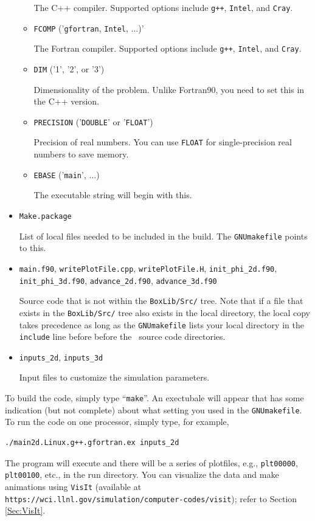 \begin{itemize}
\begin{itemize}
    The C++ compiler.  Supported options include {\tt g++}, {\tt Intel}, and
    {\tt Cray}.

    \item {\tt FCOMP} ('{\tt gfortran}, {\tt Intel}, $\ldots$)'

    The Fortran compiler.  Supported options include {\tt g++}, {\tt Intel}, and
    {\tt Cray}.

    \item {\tt DIM} ('1', '2', or '3')

    Dimensionality of the problem.  Unlike Fortran90, you need to set this in the C++ version.

    \item {\tt PRECISION} ('{\tt DOUBLE}' or '{\tt FLOAT}')

    Precision of real numbers.  You can use {\tt FLOAT} for single-precision real numbers to save memory.

    \item {\tt EBASE} ('{\tt main}', $\ldots$)

    The executable string will begin with this.

  \end{itemize}

\item {\tt Make.package}

List of local files needed to be included in the build.  The {\tt GNUmakefile} points to this.

\item {\tt main.f90}, {\tt writePlotFile.cpp}, {\tt writePlotFile.H}, {\tt init\_phi\_2d.f90},
      {\tt init\_phi\_3d.f90}, {\tt advance\_2d.f90}, {\tt advance\_3d.f90}

Source code that is not within the {\tt BoxLib/Src/} tree.  Note that if a file that 
exists in the
{\tt BoxLib/Src/} tree also exists in the local directory, the local copy takes precedence
as long as the {\tt GNUmakefile} lists your local directory in the {\tt include} line before
before the \BoxLib\ source code directories.

\item {\tt inputs\_2d}, {\tt inputs\_3d}

Input files to customize the simulation parameters.

\end{itemize}

To build the code, simply type ``{\tt make}''.  An exectubale will appear that has some indication (but not complete)
about what setting you used in the {\tt GNUmakefile}.  To run the code on one processor, simply type, for example,
\begin{lstlisting}[backgroundcolor=\color{light-red}]
./main2d.Linux.g++.gfortran.ex inputs_2d
\end{lstlisting}
The program will execute and there will be a series of plotfiles, e.g., {\tt plt00000}, 
{\tt plt00100}, etc., in the run directory.  You can visualize the data 
and make animations using {\tt VisIt} (available at {\tt https://wci.llnl.gov/simulation/computer-codes/visit});
refer to Section \ref{Sec:VisIt}.

